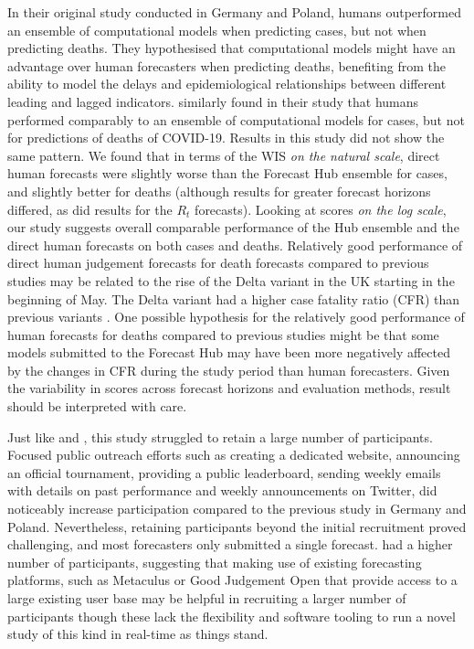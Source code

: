 \documentclass[10pt,a4paper,twocolumn]{article}
\begin{document}
In their original study conducted in Germany and Poland, \citet{bosseComparingHumanModelbased2022} humans outperformed an ensemble of computational models when predicting cases, but not when predicting deaths. They hypothesised that computational models might have an advantage over human forecasters when predicting deaths, benefiting from the ability to model the delays and epidemiological relationships between different leading and lagged indicators. \citet{mcandrewChimericForecastingCombining2022} similarly found in their study that humans performed comparably to an ensemble of computational models for cases, but not for predictions of deaths of COVID-19. 
Results in this study did not show the same pattern. We found that in terms of the WIS \textit{on the natural scale}, direct human forecasts were slightly worse than the Forecast Hub ensemble for cases, and slightly better for deaths (although results for greater forecast horizons differed, as did results for the $R_t$ forecasts). Looking at scores \textit{on the log scale}, our study suggests overall comparable performance of the Hub ensemble and the direct human forecasts on both cases and deaths. Relatively good performance of direct human judgement forecasts for death forecasts compared to previous studies may be related to the rise of the Delta variant in the UK starting in the beginning of May. The Delta variant had a higher case fatality ratio (CFR) than previous variants \cite{linDiseaseSeverityClinical2021}. One possible hypothesis for the relatively good performance of human forecasts for deaths compared to previous studies might be that some models submitted to the Forecast Hub may have been more negatively affected by the changes in CFR during the study period than human forecasters. Given the variability in scores across forecast horizons and evaluation methods, result should be interpreted with care. 




Just like \citet{bosseComparingHumanModelbased2022} and \citet{farrowHumanJudgmentApproach2017}, this study struggled to retain a large number of participants. Focused public outreach efforts such as creating a dedicated website, announcing an official tournament, providing a public leaderboard, sending weekly emails with details on past performance and weekly announcements on Twitter, did noticeably increase participation compared to the previous study in Germany and Poland. Nevertheless, retaining participants beyond the initial recruitment proved challenging, and most forecasters only submitted a single forecast. \citet{mcandrewChimericForecastingCombining2022} had a higher number of participants, suggesting that making use of existing forecasting platforms, such as Metaculus or Good Judgement Open that provide access to a large existing user base may be helpful in recruiting a larger number of participants though these lack the flexibility and software tooling to run a novel study of this kind in real-time as things stand.
\end{document}
